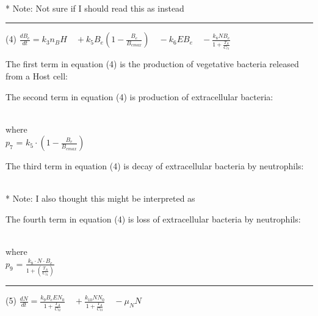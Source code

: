 \documentclass{article}
\begin{document}
\begin{center}
     \\
    * Note: Not sure if I should read this as  instead
\end{center}


\hrule

\begin{center}
        (4) $\displaystyle \frac{dB_e}{dt} = k_3 n_B H\quad + k_5 B_e (1 - \frac{B_e}{B_{emax}})\quad - k_6 E B_e\quad - \frac{k_8 N B_e}{1+ \frac{T_A}{C_{t1}}} $
\end{center}

The first term in equation (4) is the production of vegetative bacteria released from a Host cell:

\begin{center}
\end{center}

The second term in equation (4) is production of extracellular bacteria:

\begin{center}
    \\
    where\\
    $p_7$ = $k_5 \cdot (1 - \frac{B_e}{B_{emax}})$
\end{center}

\pagebreak

The third term in equation (4) is decay of extracellular bacteria by neutrophils:

\begin{center}
     \\
    * Note: I also thought this might be interpreted as 
\end{center}


The fourth term in equation (4) is loss of extracellular bacteria by neutrophils:

\begin{center}
    \\
    where\\
    $p_9$ = $\frac{k_8 \cdot N \cdot B_e}{1 + (\frac{T_A}{C_{t1}})}$
\end{center}

\hrule
\begin{center}
        (5) $\displaystyle \frac{dN}{dt} = \frac{k_9 B_e E N_0}{1 + \frac{T_A}{C_{t2}}}\quad + \frac{k_{10} N N_0}{1 + \frac{T_A}{C_{t3}}}\quad - \mu_N N $
\end{center}
\end{document}
